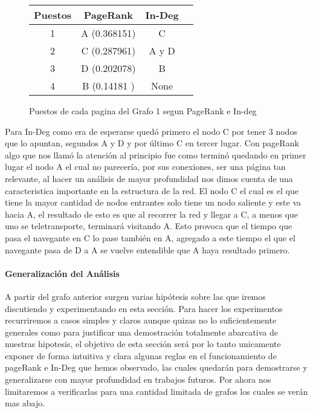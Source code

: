 \begin{figure}[H]
\centering
\begin{tabular}{| c | c | c | c |}
  \hline
  Puestos & PageRank & In-Deg \\ \hline \hline
  1 & A (0.368151) & C \\ \hline
  2 & C (0.287961) & A y D \\ \hline
  3 & D (0.202078) & B\\ \hline
  4 & B (0.14181 ) & None \\ \hline
\end{tabular}

  \caption{\footnotesize{Puestos de cada pagina del Grafo 1 segun PageRank e In-deg}}
  \label{fig:Rankings}
\end{figure}

Para In-Deg como era de esperarse quedó primero el nodo C por tener 3 nodos que lo apuntan, segundos A y D y por último C en tercer lugar. Con pageRank algo que nos llamó la atención al principio fue como terminó quedando en primer lugar el nodo A el cual no parecería, por sus conexiones, ser una página tan relevante, al hacer un análisis de mayor profundidad nos dimos cuenta de una caracteristica importante en la estructura de la red. El nodo C el cual es el que tiene la mayor cantidad de nodos entrantes solo tiene un nodo saliente y este va hacia A, el resultado de esto es que al recorrer la red y llegar a C, a menos que uno se teletransporte, terminará visitando A. Esto provoca que el tiempo que pasa el navegante en C lo pase también en A, agregado a este tiempo el que el navegante pasa de D a A se vuelve entendible que A haya resultado primero.

\paragraph{Generalización del Análisis}

A partir del grafo anterior surgen varias hipótesis sobre las que iremos discutiendo y experimentando en esta sección. Para hacer los experimentos recurriremos a casos simples y claros aunque quizas no lo suficientemente generales como para justificar una demostración totalmente abarcativa de nuestras hipotesis, el objetivo de esta sección será por lo tanto unicamente exponer de forma intuitiva y clara algunas reglas en el funcionamiento de pageRank e In-Deg que hemos observado, las cuales quedarán para demostrarse y generalizarse con mayor profundidad en trabajos futuros. Por ahora nos limitaremos a verificarlas para una cantidad limitada de grafos los cuales se verán mas abajo.

